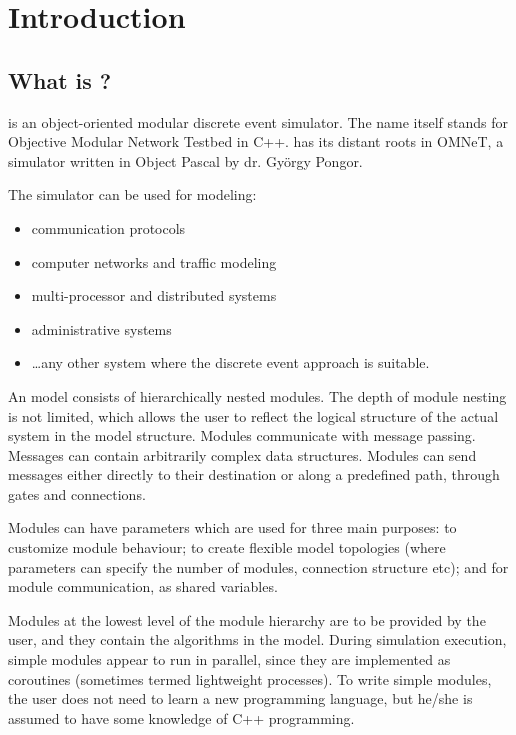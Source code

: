 \chapter{Introduction}
\label{cha:introduction}


\section{What is {\opp}?}

{\opp} is an object-oriented modular discrete event simulator.
The name itself stands for Objective Modular Network Testbed
in C++. {\opp} has its distant roots in OMNeT, a simulator written
in Object Pascal by dr. Gy\"{o}rgy Pongor.

The simulator can be used for modeling:
\begin{itemize}
  \item{communication protocols}
  \item{computer networks and traffic modeling}
  \item{multi-processor and distributed systems}
  \item{administrative systems}
  \item{\dots any other system where the discrete event approach is
    suitable.}
\end{itemize}


An {\opp} model consists of hierarchically nested modules. The
depth of module nesting is not limited, which allows the user
to reflect the logical structure of the actual system in the
model structure. Modules communicate with message passing. Messages
can contain arbitrarily complex data structures. Modules can
send messages either directly to their destination or along a
predefined path, through gates and connections.


Modules can have parameters which are used for three main purposes:
to customize module behaviour; to create flexible model topologies
(where parameters can specify the number of modules, connection
structure etc); and for module communication, as shared variables.

Modules at the lowest level of the module hierarchy are to be
provided by the user, and they contain the algorithms in the
model. During simulation execution, simple modules appear to
run in parallel, since they are implemented as coroutines (sometimes
termed lightweight processes). To write simple modules, the user
does not need to learn a new programming language, but he/she
is assumed to have some knowledge of C++ programming.

